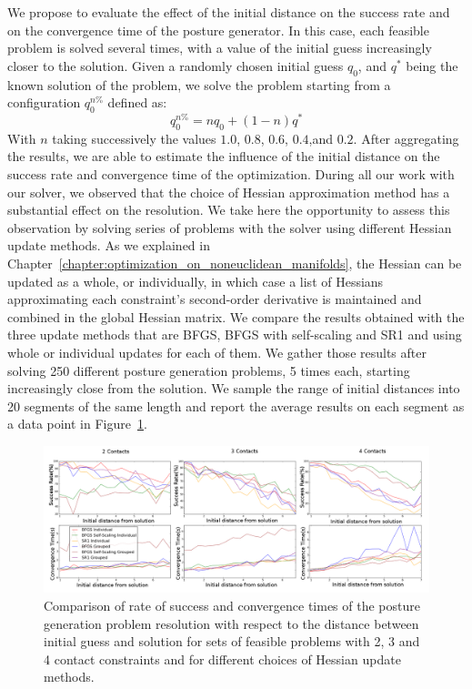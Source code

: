 We propose to evaluate the effect of the initial distance on the success rate and on the convergence time of the posture generator.
In this case, each feasible problem is solved several times, with a value of the initial guess increasingly closer to the solution.
Given a randomly chosen initial guess $q_0$, and $q^*$ being the known solution of the problem, we solve the problem starting from a configuration $q_0^{n\%}$ defined as:
\begin{equation}
  q_0^{n\%} = n q_0 + (1-n)q^*
\end{equation}
With $n$ taking successively the values $1.0$, $0.8$, $0.6$, $0.4$,and $0.2$.
After aggregating the results, we are able to estimate the influence of the initial distance on the success rate and convergence time of the optimization.
During all our work with our solver, we observed that the choice of Hessian approximation method has a substantial effect on the resolution.
We take here the opportunity to assess this observation by solving series of problems with the solver using different Hessian update methods.
As we explained in Chapter~\ref{chapter:optimization_on_noneuclidean_manifolds}, the Hessian can be updated as a whole, or individually, in which case a list of Hessians approximating each constraint's second-order derivative is maintained and combined in the global Hessian matrix.
We compare the results obtained with the three update methods that are BFGS, BFGS with self-scaling and SR1 and using whole or individual updates for each of them.
We gather those results after solving 250 different posture generation problems, 5 times each, starting increasingly close from the solution.
We sample the range of initial distances into 20 segments of the same length and report the average results on each segment as a data point in Figure~\ref{fig:evalPG}.

\begin{figure}[htb]
\centering
  \includegraphics[width=\linewidth]{evalPG/resWithSR1Grouped.png}
  \caption{Comparison of rate of success and convergence times of the posture generation problem resolution with respect to the distance between initial guess and solution for sets of feasible problems with 2, 3 and 4 contact constraints and for different choices of Hessian update methods.}
\label{fig:evalPG}
\end{figure}

